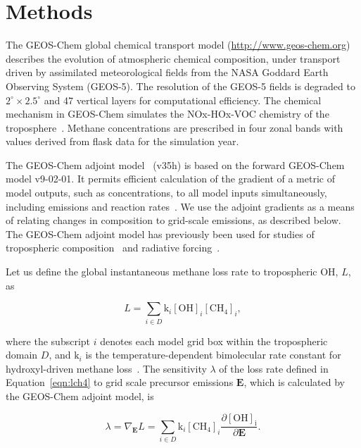 \section{Methods}

The GEOS-Chem global chemical transport model (\url{http://www.geos-chem.org}) describes the evolution of atmospheric chemical composition, under transport driven by assimilated meteorological fields from the NASA Goddard Earth Observing System (GEOS-5). The resolution of the GEOS-5 fields is degraded to $2^{\circ} \times 2.5^{\circ}$ and 47 vertical layers for computational efficiency. The chemical mechanism in GEOS-Chem simulates the NOx-HOx-VOC chemistry of the troposphere~\citep{ref:mao2010}. Methane concentrations are prescribed in four zonal bands with values derived from flask data for the simulation year.


The GEOS-Chem adjoint model~\cite{ref:henze2007} (v35h) is based on the forward GEOS-Chem model v9-02-01. It permits efficient calculation of the gradient of a metric of model outputs, such as concentrations, to all model inputs simultaneously, including emissions and reaction rates~\cite{ref:paulot2012}. We use the adjoint gradients as a means of relating changes in composition to grid-scale emissions, as described below. The GEOS-Chem adjoint model has previously been used for studies of tropospheric composition~\citep{ref:zhang2009,ref:walker2012} and radiative forcing~\citep{ref:bowman2012}.

Let us define the global instantaneous methane loss rate to tropospheric OH, $L$, as

\begin{equation}
L=\sum_{i \in D} \mathrm{k}_i \mathrm{[OH]}_i \mathrm{[CH_4]}_i,
\label{eqn:lch4}
\end{equation}

where the subscript $i$ denotes each model grid box within the tropospheric domain $D$, and $\mathrm{k}_i$ is the temperature-dependent bimolecular rate constant for hydroxyl-driven methane loss~\citep{ref:sander2011}. The sensitivity $\lambda$ of the loss rate defined in Equation~\ref{eqn:lch4} to grid scale precursor emissions $\mathbf{E}$, which is calculated by the GEOS-Chem adjoint model, is

\begin{equation}
\lambda = \nabla_\mathbf{E} L = \sum_{i \in D} \mathrm{k}_i \mathrm{[CH_4]}_i \frac{\partial \mathrm{[OH]_i}}{\partial \mathbf{E}}.
\label{eqn:dLdE}
\end{equation}

